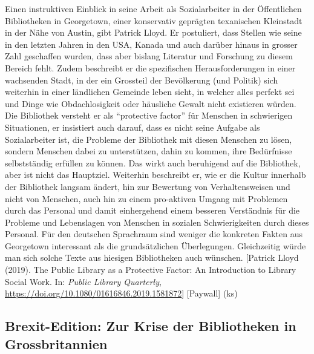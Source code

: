 \documentclass[a4paper,
fontsize=11pt,
oneside,
numbers=noperiodatend,
parskip=half-,
bibliography=totoc,
final
]{scrartcl}
\begin{document}
Einen instruktiven Einblick in seine Arbeit als Sozialarbeiter in der
Öffentlichen Bibliotheken in Georgetown, einer konservativ geprägten
texanischen Kleinstadt in der Nähe von Austin, gibt Patrick Lloyd. Er
postuliert, dass Stellen wie seine in den letzten Jahren in den USA,
Kanada und auch darüber hinaus in grosser Zahl geschaffen wurden, dass
aber bislang Literatur und Forschung zu diesem Bereich fehlt. Zudem
beschreibt er die spezifischen Herausforderungen in einer wachsenden
Stadt, in der ein Grossteil der Bevölkerung (und Politik) sich weiterhin
in einer ländlichen Gemeinde leben sieht, in welcher alles perfekt sei
und Dinge wie Obdachlosigkeit oder häusliche Gewalt nicht existieren
würden. Die Bibliothek versteht er als \enquote{protective factor} für
Menschen in schwierigen Situationen, er insistiert auch darauf, dass es
nicht seine Aufgabe als Sozialarbeiter ist, die Probleme der Bibliothek
mit diesen Menschen zu lösen, sondern Menschen dabei zu unterstützen,
dahin zu kommen, ihre Bedürfnisse selbstständig erfüllen zu können. Das
wirkt auch beruhigend auf die Bibliothek, aber ist nicht das Hauptziel.
Weiterhin beschreibt er, wie er die Kultur innerhalb der Bibliothek
langsam ändert, hin zur Bewertung von Verhaltensweisen und nicht von
Menschen, auch hin zu einem pro-aktiven Umgang mit Problemen durch das
Personal und damit einhergehend einem besseren Verständnis für die
Probleme und Lebenslagen von Menschen in sozialen Schwierigkeiten durch
dieses Personal. Für den deutschen Sprachraum sind weniger die konkreten
Fakten aus Georgetown interessant als die grundsätzlichen Überlegungen.
Gleichzeitig würde man sich solche Texte aus hiesigen Bibliotheken auch
wünschen. {[}Patrick Lloyd (2019). The Public Library as a Protective
Factor: An Introduction to Library Social Work. In: \emph{Public Library
Quarterly}, \url{https://doi.org/10.1080/01616846.2019.1581872}{]}
{[}Paywall{]} (ks)

\hypertarget{brexit-edition-zur-krise-der-bibliotheken-in-grossbritannien}{%
\subsection{Brexit-Edition: Zur Krise der Bibliotheken in
Grossbritannien}\label{brexit-edition-zur-krise-der-bibliotheken-in-grossbritannien}}
\end{document}
